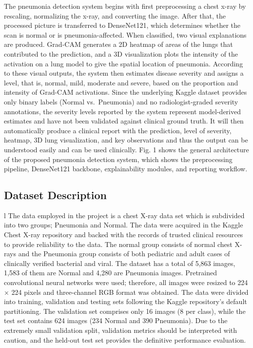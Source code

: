 \documentclass[conference]{IEEEtran}
\begin{document}
The pneumonia detection system begins with first preprocessing a chest x-ray by rescaling, normalizing the x-ray, and converting the image. After that, the processed picture is transferred to DenseNet121, which determines whether the scan is normal or is pneumonia-affected. When classified, two visual explanations are produced. Grad-CAM generates a 2D heatmap of areas of the lungs that contributed to the prediction, and a 3D visualization plots the intensity of the activation on a lung model to give the spatial location of pneumonia. According to these visual outputs, the system then estimates disease severity and assigns a level, that is, normal, mild, moderate and severe, based on the proportion and intensity of Grad-CAM activations. Since the underlying Kaggle dataset provides only binary labels (Normal vs.\ Pneumonia) and no radiologist-graded severity annotations, the severity levels reported by the system represent model-derived estimates and have not been validated against clinical ground truth. It will then automatically produce a clinical report with the prediction, level of severity, heatmap, 3D lung visualization, and key observations and thus the output can be understood easily and can be used clinically. Fig. 1 shows the general architecture of the proposed pneumonia detection system, which shows the preprocessing pipeline, DenseNet121 backbone, explainability modules, and reporting workflow.
\\
\subsection{\textbf{Dataset Description}}l
The data employed in the project is a chest X-ray data set which is subdivided into two groups; Pneumonia and Normal. The data were acquired in the Kaggle Chest X-ray repository and backed with the records of trusted clinical resources to provide reliability to the data. The normal group consists of normal chest X-rays and the Pneumonia group consists of both pediatric and adult cases of clinically verified bacterial and viral. The dataset has a total of 5,863 images, 1,583 of them are Normal and 4,280 are Pneumonia images.
Pretrained convolutional neural networks were used; therefore, all images were resized to 224 × 224 pixels and three-channel RGB format was obtained. The data were divided into training, validation and testing sets following the Kaggle repository's default partitioning. The validation set comprises only 16 images (8 per class), while the test set contains 624 images (234 Normal and 390 Pneumonia). Due to the extremely small validation split, validation metrics should be interpreted with caution, and the held-out test set provides the definitive performance evaluation.
\end{document}
